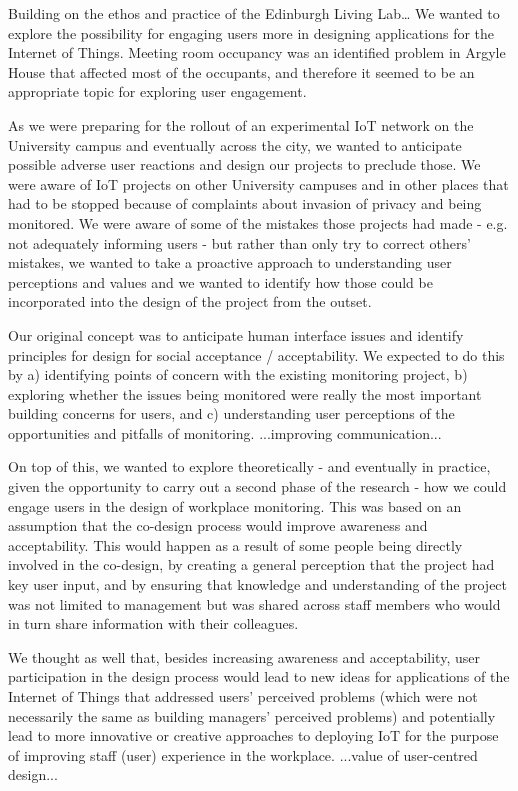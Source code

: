 Building on the ethos and practice of the Edinburgh Living Lab… We wanted to explore the possibility for engaging users more in designing applications for the Internet of Things. Meeting room occupancy was an identified problem in Argyle House that affected most of the occupants, and therefore it seemed to be an appropriate topic for exploring user engagement.

As we were preparing for the rollout of an experimental IoT network on the University campus and eventually across the city, we wanted to anticipate possible adverse user reactions and design our projects to preclude those. We were aware of IoT projects on other University campuses and in other places that had to be stopped because of complaints about invasion of privacy and being monitored.
We were aware of some of the mistakes those projects had made - e.g. not adequately informing users - but rather than only try to correct others’ mistakes, we wanted to take a proactive approach to understanding user perceptions and values and we wanted to identify how those could be incorporated into the design of the project from the outset.

Our original concept was to anticipate human interface issues and identify principles for design for social acceptance / acceptability. We expected to do this by a) identifying points of concern with the existing monitoring project, b) exploring whether the issues being monitored were really the most important building concerns for users, and c) understanding user perceptions of the opportunities and pitfalls of monitoring. ...improving communication...

On top of this, we wanted to explore theoretically - and eventually in practice, given the opportunity to carry out a second phase of the research - how we could engage users in the design of workplace monitoring. This was based on an assumption that the co-design process would improve awareness and acceptability. This would happen as a result of some people being directly involved in the co-design, by creating a general perception that the project had key user input, and by ensuring that knowledge and understanding of the project was not limited to management but was shared across staff members who would in turn share information with their colleagues.

We thought as well that, besides increasing awareness and acceptability, user participation in the design process would lead to new ideas for applications of the Internet of Things that addressed users’ perceived problems (which were not necessarily the same as building managers’ perceived problems) and potentially lead to more innovative or creative approaches to deploying IoT for the purpose of improving staff (user) experience in the workplace. ...value of user-centred design...
